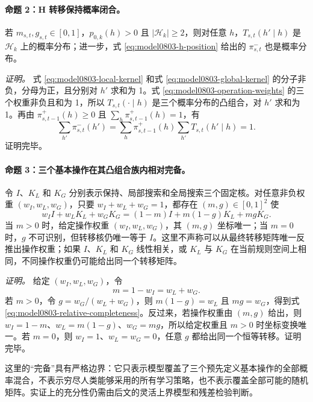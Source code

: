\paragraph{命题 2：H 转移保持概率闭合。}
若 $m_{s,t},g_{s,t}\in[0,1]$，$p_{0,k}(h)>0$ 且 $|\mathcal H_k|\geq2$，则对任意 $h$，$T_{s,t}(h'\mid h)$ 是 $\mathcal H_k$ 上的概率分布；进一步，式 \ref{eq:model0803-h-position} 给出的 $\pi^-_{s,t}$ 也是概率分布。

\textit{证明。}
式 \ref{eq:model0803-local-kernel} 和式 \ref{eq:model0803-global-kernel} 的分子非负，分母为正，且分别对 $h'$ 求和为 1。式 \ref{eq:model0803-operation-weights} 的三个权重非负且和为 1，所以 $T_{s,t}(\cdot\mid h)$ 是三个概率分布的凸组合，对 $h'$ 求和为 1。再由 $\pi^+_{s,t-1}(h)\geq0$ 且 $\sum_h\pi^+_{s,t-1}(h)=1$，有
\begin{equation}
    \sum_{h'}\pi^-_{s,t}(h')
    =\sum_h\pi^+_{s,t-1}(h)
      \sum_{h'}T_{s,t}(h'\mid h)
    =1.
\end{equation}
证明完毕。

\paragraph{命题 3：三个基本操作在其凸组合族内相对完备。}
令 $I$、$K_L$ 和 $K_G$ 分别表示保持、局部搜索和全局搜索三个固定核。对任意非负权重 $(w_I,w_L,w_G)$，只要 $w_I+w_L+w_G=1$，都存在 $(m,g)\in[0,1]^2$ 使
\begin{equation}
    w_I I+w_LK_L+w_GK_G
    =(1-m)I+m(1-g)K_L+mgK_G.
    \label{eq:model0803-relative-completeness}
\end{equation}
当 $m>0$ 时，给定操作权重 $(w_I,w_L,w_G)$，其 $(m,g)$ 坐标唯一；当 $m=0$ 时，$g$ 不可识别，但转移核仍唯一等于 $I$。这里不声称可以从最终转移矩阵唯一反推出操作权重；如果 $I$、$K_L$ 和 $K_G$ 线性相关，或 $K_L$ 与 $K_G$ 在当前规则空间上相同，不同操作权重仍可能给出同一个转移矩阵。

\textit{证明。}
给定 $(w_I,w_L,w_G)$，令
\begin{equation}
    m=1-w_I=w_L+w_G.
\end{equation}
若 $m>0$，令 $g=w_G/(w_L+w_G)$，则 $m(1-g)=w_L$ 且 $mg=w_G$，得到式 \ref{eq:model0803-relative-completeness}。反过来，若操作权重由 $(m,g)$ 给出，则 $w_I=1-m$、$w_L=m(1-g)$、$w_G=mg$，所以给定权重且 $m>0$ 时坐标变换唯一。若 $m=0$，则 $w_I=1$、$w_L=w_G=0$，任意 $g$ 都给出同一个恒等转移。证明完毕。

这里的“完备”具有严格边界：它只表示模型覆盖了三个预先定义基本操作的全部概率混合，不表示穷尽人类能够采用的所有学习策略，也不表示覆盖全部可能的随机矩阵。实证上的充分性仍需由后文的灵活上界模型和残差检验判断。

